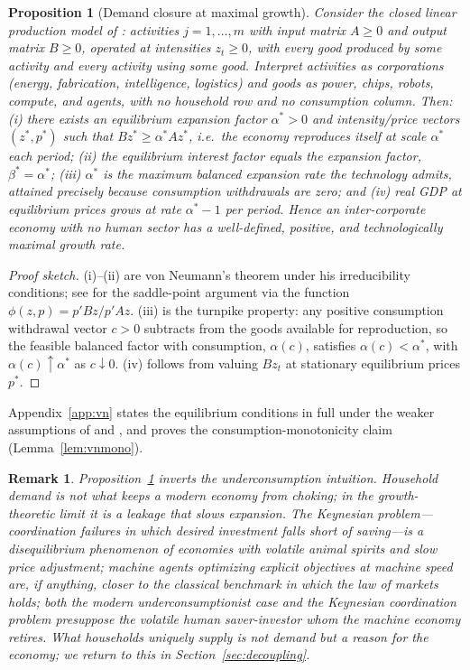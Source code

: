 \documentclass[11pt]{article}
\newtheorem{proposition}{Proposition}
\newtheorem{remark}{Remark}
\begin{document}
\begin{proposition}[Demand closure at maximal growth]\label{prop:vn}
Consider the closed linear production model of \citet{vonneumann1945}: activities $j=1,\dots,m$ with input matrix $A\ge 0$ and output matrix $B\ge 0$, operated at intensities $z_t \ge 0$, with every good produced by some activity and every activity using some good. Interpret activities as corporations (energy, fabrication, intelligence, logistics) and goods as power, chips, robots, compute, and agents, with \emph{no household row and no consumption column}. Then: (i) there exists an equilibrium expansion factor $\alpha^{*} > 0$ and intensity/price vectors $(z^{*}, p^{*})$ such that $B z^{*} \ge \alpha^{*} A z^{*}$, i.e.\ the economy reproduces itself at scale $\alpha^{*}$ each period; (ii) the equilibrium interest factor equals the expansion factor, $\beta^{*} = \alpha^{*}$; (iii) $\alpha^{*}$ is the \emph{maximum} balanced expansion rate the technology admits, attained precisely because consumption withdrawals are zero; and (iv) real GDP at equilibrium prices grows at rate $\alpha^{*} - 1$ per period. Hence an inter-corporate economy with no human sector has a well-defined, positive, and technologically maximal growth rate.
\end{proposition}

\begin{proof}[Proof sketch]
(i)--(ii) are von Neumann's theorem under his irreducibility conditions; see \citet{dorfman1958} for the saddle-point argument via the function $\phi(z,p) = p'Bz / p'Az$. (iii) is the turnpike property: any positive consumption withdrawal vector $c>0$ subtracts from the goods available for reproduction, so the feasible balanced factor with consumption, $\alpha(c)$, satisfies $\alpha(c) < \alpha^{*}$, with $\alpha(c) \uparrow \alpha^{*}$ as $c \downarrow 0$. (iv) follows from valuing $Bz_t$ at stationary equilibrium prices $p^{*}$.
\end{proof}

Appendix~\ref{app:vn} states the equilibrium conditions in full under the weaker assumptions of \citet{kemeny1956} and \citet{gale1956}, and proves the consumption-monotonicity claim (Lemma~\ref{lem:vnmono}).

\begin{remark}
Proposition~\ref{prop:vn} inverts the underconsumption intuition. Household demand is not what keeps a modern economy from choking; in the growth-theoretic limit it is a \emph{leakage} that slows expansion. The Keynesian problem---coordination failures in which desired investment falls short of saving---is a disequilibrium phenomenon of economies with volatile animal spirits and slow price adjustment; machine agents optimizing explicit objectives at machine speed are, if anything, closer to the classical benchmark in which the law of markets \citep{say1803} holds; both the modern underconsumptionist case \citep{ford2015} and the Keynesian coordination problem \citep{keynes1936} presuppose the volatile human saver-investor whom the machine economy retires. What households uniquely supply is not demand but a \emph{reason} for the economy; we return to this in Section~\ref{sec:decoupling}.
\end{remark}
\end{document}
